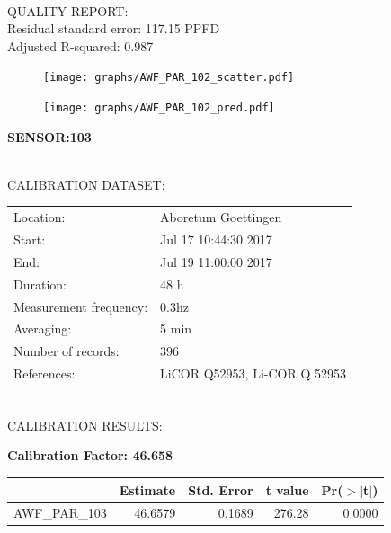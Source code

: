 \documentclass[oneside]{report}
\begin{document}
\hrulefill\\
QUALITY REPORT:\\
Residual standard error: 117.15 PPFD\\
Adjusted R-squared: 0.987



\begin{figure}[H]
  \centering
  \texttt{[image: graphs/AWF\_PAR\_102\_scatter.pdf]}
\end{figure}




\begin{figure}[H]
  \centering
  \texttt{[image: graphs/AWF\_PAR\_102\_pred.pdf]}
\end{figure}

\pagebreak


\begin{center}
\large{\textbf{SENSOR:103}}\\
\end{center}

\hrulefill\\
CALIBRATION DATASET:\\
\begin{table}[h!]
  \centering
  \label{tab:table1}
  \begin{tabular}{ll}
    Location: & Aboretum Goettingen\\ 
    
    
    Start:  & Jul 17 10:44:30 2017 \\
    End:   & Jul 19 11:00:00 2017\\ 
    Duration: & 48 h\\
    Measurement frequency: & 0.3hz\\
    Averaging:  &5 min\\
    Number of records: & 396 \\
    References: & LiCOR Q52953, Li-COR Q 52953 \\
  \end{tabular}
\end{table}

\hrulefill\\
CALIBRATION RESULTS:\\


\begin{center}
\textbf{\large{Calibration Factor: 46.658}}\\
\end{center}
\begin{table}[ht]
\centering
\begin{tabular}{rrrrr}
  \hline
 & Estimate & Std. Error & t value & Pr($>$$|$t$|$) \\ 
  \hline
AWF\_PAR\_103 & 46.6579 & 0.1689 & 276.28 & 0.0000 \\ 
   \hline
\end{tabular}
\end{table}
\end{document}
